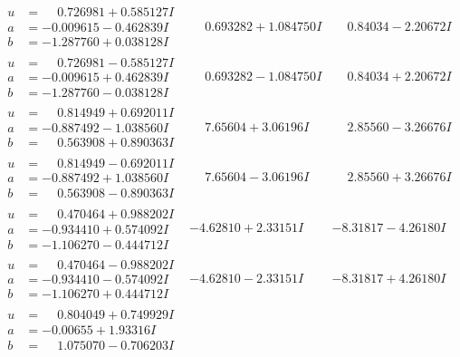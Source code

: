 \documentclass[1p]{elsarticle_modified}
\theoremstyle{definition}
\begin{document}
$$\begin{array}{c|c|c}
\begin{aligned}
u &= \phantom{-}0.726981 + 0.585127 I \\
a &= -0.009615 - 0.462839 I \\
b &= -1.287760 + 0.038128 I\end{aligned}
 & \phantom{-}0.693282 + 1.084750 I & \phantom{-}0.84034 - 2.20672 I \\ \hline\begin{aligned}
u &= \phantom{-}0.726981 - 0.585127 I \\
a &= -0.009615 + 0.462839 I \\
b &= -1.287760 - 0.038128 I\end{aligned}
 & \phantom{-}0.693282 - 1.084750 I & \phantom{-}0.84034 + 2.20672 I \\ \hline\begin{aligned}
u &= \phantom{-}0.814949 + 0.692011 I \\
a &= -0.887492 - 1.038560 I \\
b &= \phantom{-}0.563908 + 0.890363 I\end{aligned}
 & \phantom{-}7.65604 + 3.06196 I & \phantom{-}2.85560 - 3.26676 I \\ \hline\begin{aligned}
u &= \phantom{-}0.814949 - 0.692011 I \\
a &= -0.887492 + 1.038560 I \\
b &= \phantom{-}0.563908 - 0.890363 I\end{aligned}
 & \phantom{-}7.65604 - 3.06196 I & \phantom{-}2.85560 + 3.26676 I \\ \hline\begin{aligned}
u &= \phantom{-}0.470464 + 0.988202 I \\
a &= -0.934410 + 0.574092 I \\
b &= -1.106270 - 0.444712 I\end{aligned}
 & -4.62810 + 2.33151 I & -8.31817 - 4.26180 I \\ \hline\begin{aligned}
u &= \phantom{-}0.470464 - 0.988202 I \\
a &= -0.934410 - 0.574092 I \\
b &= -1.106270 + 0.444712 I\end{aligned}
 & -4.62810 - 2.33151 I & -8.31817 + 4.26180 I \\ \hline\begin{aligned}
u &= \phantom{-}0.804049 + 0.749929 I \\
a &= -0.00655 + 1.93316 I \\
b &= \phantom{-}1.075070 - 0.706203 I\end{aligned}

\end{array}$$
\end{document}
